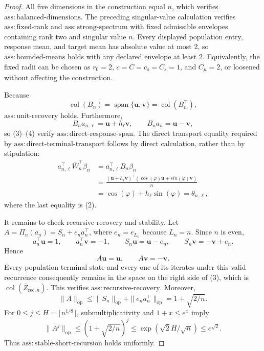 \documentclass{article}
\begin{document}
\begin{proof}
All five dimensions in the construction equal \(n\), which verifies
\(\mathrm{ass{:}balanced\mbox{-}dimensions}\).  The preceding singular-value
calculation verifies \(\mathrm{ass{:}fixed\mbox{-}rank}\) and
\(\mathrm{ass{:}strong\mbox{-}spectrum}\) with fixed admissible envelopes
containing rank two and singular value \(n\).  Every displayed population
entry, response mean, and target mean has absolute value at most \(2\), so
\(\mathrm{ass{:}bounded\mbox{-}means}\) holds with any declared envelope at
least \(2\).  Equivalently, the fixed radii can be chosen as
\(r_0=2\), \(c=C=c_s=C_s=1\), and \(C_\mu=2\), or loosened without affecting
the construction.

Because
\[
 \operatorname{col}(B_n)=\operatorname{span}\{\boldsymbol u,\boldsymbol v\}
 =\operatorname{col}(B_n^{\top}),                             \tag{3}
\]
\(\mathrm{ass{:}unit\mbox{-}recovery}\) holds.  Furthermore,
\[
 B_na_{n,\ell}=\boldsymbol u+h_\ell\boldsymbol v,
 \qquad B_na_n=\boldsymbol u-\boldsymbol v,                   \tag{4}
\]
so (3)--(4) verify \(\mathrm{ass{:}direct\mbox{-}response\mbox{-}span}\).
The direct transport equality required by
\(\mathrm{ass{:}direct\mbox{-}terminal\mbox{-}transport}\) follows by direct
calculation, rather than by stipulation:
\[
\begin{aligned}
 a_{n,\ell}^{\top}\bar W_n^{\top}\beta_n
 &=a_{n,\ell}^{\top}B_n\beta_n\\
 &=\frac{(\boldsymbol u+h_\ell\boldsymbol v)^{\top}
              (\cos(\varphi)\boldsymbol u+sin(\varphi)\boldsymbol v)}{n}\\
 &=\cos(\varphi)+h_\ell\sin(\varphi)
 =\theta_{n,\ell},
\end{aligned}                                                  \tag{5}
\]
where the last equality is (2).

It remains to check recursive recovery and stability.  Let
\(A=\Pi_n(a_n)=S_n+e_na_n^{\top}\), where \(e_n=e_{L_n}\) because
\(L_n=n\).  Since \(n\) is even,
\[
 a_n^{\top}\boldsymbol u=1,
 \qquad a_n^{\top}\boldsymbol v=-1,
 \qquad S_n\boldsymbol u=\boldsymbol u-e_n,
 \qquad S_n\boldsymbol v=-\boldsymbol v+e_n.
\]
Hence
\[
 A\boldsymbol u=\boldsymbol u,
 \qquad A\boldsymbol v=-\boldsymbol v.                       \tag{6}
\]
Every population terminal state and every one of its iterates under this valid
recurrence consequently remains in the space on the right side of (3), which
is \(\operatorname{col}(\bar Z_{\mathrm{rec},n})\).  This verifies
\(\mathrm{ass{:}recursive\mbox{-}recovery}\).  Moreover,
\[
 \|A\|_{\mathrm{op}}
 \leq \|S_n\|_{\mathrm{op}}+\|e_na_n^{\top}\|_{\mathrm{op}}
 =1+\sqrt{2/n}.
\]
For \(0\leq j\leq H=\lfloor n^{1/8}\rfloor\), submultiplicativity and
\(1+x\leq e^x\) imply
\[
 \|A^j\|_{\mathrm{op}}
 \leq(1+\sqrt{2/n})^j
 \leq\exp(\sqrt2 H/\sqrt n)
 \leq e^{\sqrt2}.                                             \tag{7}
\]
Thus \(\mathrm{ass{:}stable\mbox{-}short\mbox{-}recursion}\) holds uniformly.


\end{proof}
\end{document}
